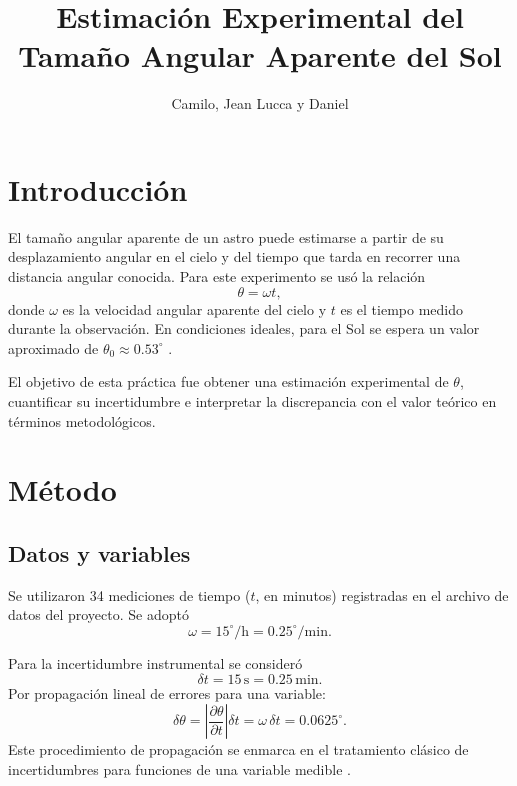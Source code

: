 \documentclass[stu,12pt,floatsintext]{apa7}
\title{Estimación Experimental del Tamaño Angular Aparente del Sol}
\author{Camilo, Jean Lucca y Daniel}
\affiliation{Universidad de Antioquia}
\begin{document}
\maketitle

\section{Introducción}
El tamaño angular aparente de un astro puede estimarse a partir de su desplazamiento angular en el cielo y del tiempo que tarda en recorrer una distancia angular conocida. Para este experimento se usó la relación
\begin{equation}
\theta = \omega t,
\end{equation}
donde $\omega$ es la velocidad angular aparente del cielo y $t$ es el tiempo medido durante la observación. En condiciones ideales, para el Sol se espera un valor aproximado de $\theta_0\approx0.53^\circ$ \parencite{portilla2009elementos}.

El objetivo de esta práctica fue obtener una estimación experimental de $\theta$, cuantificar su incertidumbre e interpretar la discrepancia con el valor teórico en términos metodológicos.

\section{Método}
\subsection{Datos y variables}
Se utilizaron 34 mediciones de tiempo ($t$, en minutos) registradas en el archivo de datos del proyecto. Se adoptó
\begin{equation}
\omega = 15^\circ/\mathrm{h} = 0.25^\circ/\mathrm{min}.
\end{equation}

Para la incertidumbre instrumental se consideró
\begin{equation}
\delta t = 15\,\mathrm{s} = 0.25\,\mathrm{min}.
\end{equation}
Por propagación lineal de errores para una variable:
\begin{equation}
\delta\theta = \left|\frac{\partial \theta}{\partial t}\right|\delta t = \omega\,\delta t = 0.0625^\circ.
\end{equation}
Este procedimiento de propagación se enmarca en el tratamiento clásico de incertidumbres para funciones de una variable medible \parencite{baird1991experimentacion}.
\end{document}

